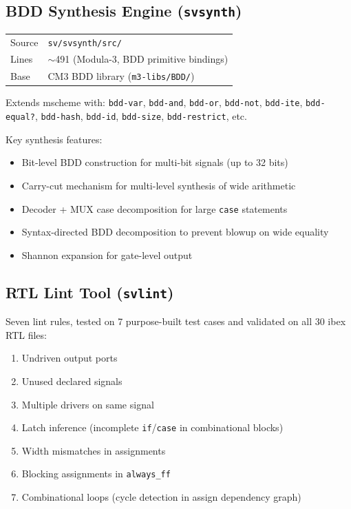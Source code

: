 \documentclass[11pt]{article}
\begin{document}
\subsection{BDD Synthesis Engine (\texttt{svsynth})}

\begin{tabular}{@{}ll@{}}
\toprule
Source & \texttt{sv/svsynth/src/} \\
Lines  & $\sim$491 (Modula-3, BDD primitive bindings) \\
Base   & CM3 BDD library (\texttt{m3-libs/BDD/}) \\
\bottomrule
\end{tabular}

\medskip\noindent
Extends mscheme with: \texttt{bdd-var}, \texttt{bdd-and},
\texttt{bdd-or}, \texttt{bdd-not}, \texttt{bdd-ite},
\texttt{bdd-equal?}, \texttt{bdd-hash}, \texttt{bdd-id},
\texttt{bdd-size}, \texttt{bdd-restrict}, etc.

Key synthesis features:
\begin{itemize}[nosep]
\item Bit-level BDD construction for multi-bit signals (up to 32 bits)
\item Carry-cut mechanism for multi-level synthesis of wide arithmetic
\item Decoder + MUX case decomposition for large \texttt{case} statements
\item Syntax-directed BDD decomposition to prevent blowup on wide equality
\item Shannon expansion for gate-level output
\end{itemize}

\subsection{RTL Lint Tool (\texttt{svlint})}

Seven lint rules, tested on 7 purpose-built test cases and validated
on all 30 ibex RTL files:

\begin{enumerate}[nosep]
\item Undriven output ports
\item Unused declared signals
\item Multiple drivers on same signal
\item Latch inference (incomplete \texttt{if}/\texttt{case} in combinational blocks)
\item Width mismatches in assignments
\item Blocking assignments in \texttt{always\_ff}
\item Combinational loops (cycle detection in assign dependency graph)
\end{enumerate}
\end{document}
